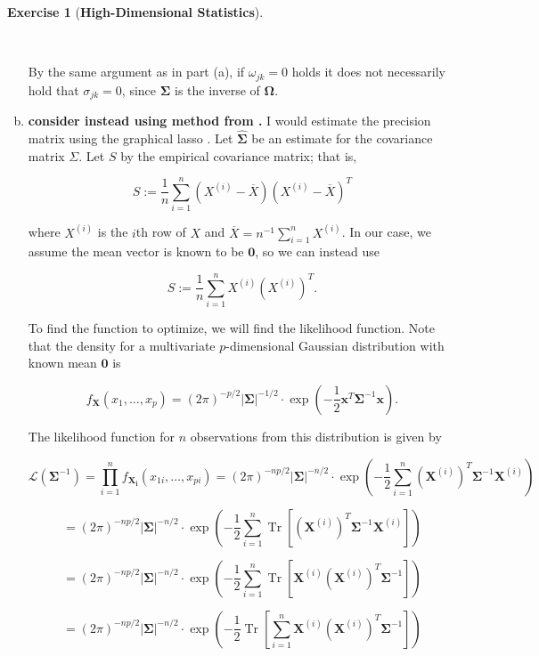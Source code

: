 \documentclass{article}
\theoremstyle{definition}
\newtheorem{exercise}{Exercise}
\theoremstyle{definition}
\theoremstyle{definition}
\theoremstyle{definition}
\theoremstyle{definition}
\DeclareMathOperator{\Tr}{Tr}
\begin{document}
\begin{exercise}[\textbf{High-Dimensional Statistics}]
\begin{enumerate}[(a)]
\

By the same argument as in part (a), if \(\omega_{jk} = 0\) holds it does not necessarily hold that \(\sigma_{jk} =0\), since \(\boldsymbol{\Sigma}\) is the inverse of \(\boldsymbol{\Omega}\).

\item \textbf{consider instead using method from \citet{Fan2008}.} I would estimate the precision matrix using the graphical lasso \citep{Friedman2008}. Let \(\boldsymbol{\hat{\Sigma}}\) be an estimate for the covariance matrix \(\Sigma\). Let \(S\) by the empirical covariance matrix; that is,

\[
S := \frac{1}{n} \sum_{i=1}^n (X^{(i)} - \overline{X})(X^{(i)} - \overline{X})^T
\]

where \(X^{(i)}\) is the \(i\)th row of \(X\) and \(\overline{X} = n^{-1}\sum_{i=1}^n X^{(i)}\). In our case, we assume the mean vector is known to be \(\boldsymbol{0}\), so we can instead use 

\[
S := \frac{1}{n} \sum_{i=1}^n X^{(i)}\left(X^{(i)}\right)^T.
\]

To find the function to optimize, we will find the likelihood function. Note that the density for a multivariate \(p\)-dimensional Gaussian distribution with known mean \(\boldsymbol{0}\) is

\[
f_{\boldsymbol{X}}(x_1, \ldots, x_p) = (2 \pi)^{-p/2} | \boldsymbol{\Sigma}|^{-1/2} \cdot \exp \left(- \frac{1}{2}\boldsymbol{x} ^T \boldsymbol{\Sigma}^{-1} \boldsymbol{x} \right).
\]

The likelihood function for \(n\) observations from this distribution is given by

\[
\mathcal{L}(\boldsymbol{\Sigma}^{-1}) = \prod_{i=1}^n f_{\boldsymbol{X_i}}(x_{1i}, \ldots, x_{pi}) = (2 \pi)^{-np/2} | \boldsymbol{\Sigma}|^{-n/2} \cdot \exp \left(- \frac{1}{2} \sum_{i=1}^n\left(\boldsymbol{X}^{(i)}\right)^T \boldsymbol{\Sigma}^{-1} \boldsymbol{X}^{(i)}\right)
\]

\[
= (2 \pi)^{-np/2} | \boldsymbol{\Sigma}|^{-n/2} \cdot \exp \left(- \frac{1}{2} \sum_{i=1}^n \Tr \left[ \left(\boldsymbol{X}^{(i)}\right)^T \boldsymbol{\Sigma}^{-1} \boldsymbol{X}^{(i)} \right]\right) \]

\[
= (2 \pi)^{-np/2} | \boldsymbol{\Sigma}|^{-n/2} \cdot \exp \left(- \frac{1}{2} \sum_{i=1}^n \Tr \left[ \boldsymbol{X}^{(i)} \left(\boldsymbol{X}^{(i)}\right)^T \boldsymbol{\Sigma}^{-1}  \right]\right)
\]

\[
= (2 \pi)^{-np/2} | \boldsymbol{\Sigma}|^{-n/2} \cdot \exp \left(- \frac{1}{2} \Tr \left[ \sum_{i=1}^n  \boldsymbol{X}^{(i)} \left(\boldsymbol{X}^{(i)}\right)^T \boldsymbol{\Sigma}^{-1}  \right]\right)
\]


\end{enumerate}
\end{exercise}
\end{document}
